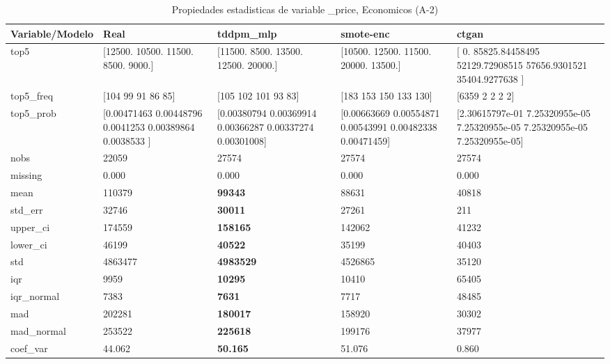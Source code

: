 \begin{table}[H]
\centering
\fontsize{8}{14}\selectfont
\caption{Propiedades  estadisticas de variable \_price, Economicos (A-2)}
\label{table-stats-economicos-a-2-_price}
\begin{tabular}{|l|m{10em}|m{10em}|m{10em}|m{10em}|}
\hline
 \rowcolor[gray]{0.8}
Variable/Modelo & Real & tddpm\_mlp & smote-enc & ctgan \\
\hline top5 & [12500. 10500. 11500.  8500.  9000.] & [11500.  8500. 13500. 12500. 20000.] & [10500. 12500. 11500. 20000. 13500.] & [    0.         85825.84458495 52129.72908515 57656.9301521
 35404.9277638 ] \\
\hline top5\_freq & [104  99  91  86  85] & [105 102 101  93  83] & [183 153 150 133 130] & [6359    2    2    2    2] \\
\hline top5\_prob & [0.00471463 0.00448796 0.0041253  0.00389864 0.0038533 ] & [0.00380794 0.00369914 0.00366287 0.00337274 0.00301008] & [0.00663669 0.00554871 0.00543991 0.00482338 0.00471459] & [2.30615797e-01 7.25320955e-05 7.25320955e-05 7.25320955e-05
 7.25320955e-05] \\
\hline nobs & 22059 & 27574 & 27574 & 27574 \\
\hline missing & 0.000 & 0.000 & 0.000 & 0.000 \\
\hline mean & 110379 & \bfseries 99343 & 88631 & \cellcolor[rgb]{0.9, 0.54, 0.52} 40818 \\
\hline std\_err & 32746 & \bfseries 30011 & 27261 & \cellcolor[rgb]{0.9, 0.54, 0.52} 211 \\
\hline upper\_ci & 174559 & \bfseries 158165 & 142062 & \cellcolor[rgb]{0.9, 0.54, 0.52} 41232 \\
\hline lower\_ci & 46199 & \bfseries 40522 & \cellcolor[rgb]{0.9, 0.54, 0.52} 35199 & 40403 \\
\hline std & 4863477 & \bfseries 4983529 & 4526865 & \cellcolor[rgb]{0.9, 0.54, 0.52} 35120 \\
\hline iqr & 9959 & \bfseries 10295 & 10410 & \cellcolor[rgb]{0.9, 0.54, 0.52} 65405 \\
\hline iqr\_normal & 7383 & \bfseries 7631 & 7717 & \cellcolor[rgb]{0.9, 0.54, 0.52} 48485 \\
\hline mad & 202281 & \bfseries 180017 & 158920 & \cellcolor[rgb]{0.9, 0.54, 0.52} 30302 \\
\hline mad\_normal & 253522 & \bfseries 225618 & 199176 & \cellcolor[rgb]{0.9, 0.54, 0.52} 37977 \\
\hline coef\_var & 44.062 & \bfseries 50.165 & 51.076 & \cellcolor[rgb]{0.9, 0.54, 0.52} 0.860 \\

\end{tabular}
\end{table}
